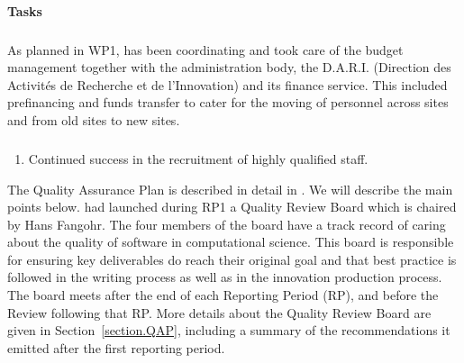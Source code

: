 \begin{itemize}
\end{itemize}


\paragraph{Tasks}

\subparagraph{}

As planned in WP1,  has been coordinating \ODK and took care
of the budget management together with the administration body, the
D.A.R.I. (Direction des Activités de Recherche et de l'Innovation) and
its finance service. This included prefinancing and funds transfer to
cater for the moving of personnel across sites and from old sites to
new sites.


\subparagraph{}


\begin{enumerate}
\item Continued success in the recruitment of highly qualified staff.
\end{enumerate}

The Quality Assurance Plan is described in detail in
. We will describe the main points
below.  had launched during RP1 a Quality Review Board which
is chaired by Hans Fangohr. The four members of the board have a track
record of caring about the quality of software in computational
science. This board is responsible for ensuring key deliverables do
reach their original goal and that best practice is followed in the
writing process as well as in the innovation production process. The
board meets after the end of each Reporting Period (RP), and before
the Review following that RP. More details about the Quality Review
Board are given in Section~\ref{section.QAP}, including a summary of
the recommendations it emitted after the first reporting period.

